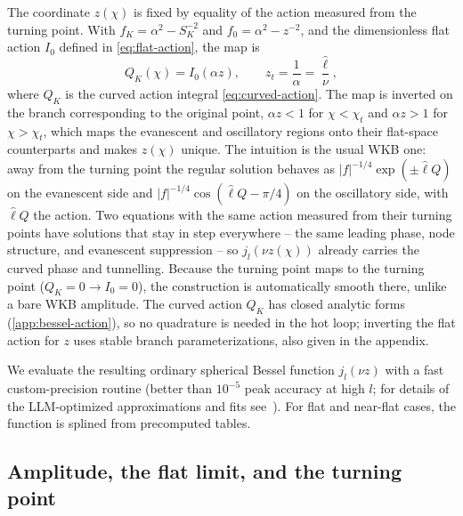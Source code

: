 \documentclass[prd, twocolumn, superscriptaddress, tightenlines, longbibliography, nofootinbib, eqsecnum, amsfonts, amsmath, floatfix, notitlepage]{revtex4-2}
\newcommand{\SK}{S_K}
\newcommand{\jl}{j_l}
\begin{document}
The coordinate $z(\chi)$ is fixed by equality of the action measured from the
turning point. With $f_K=\alpha^2-\SK^{-2}$ and $f_0=\alpha^2-z^{-2}$, and the
dimensionless flat action $I_0$ defined in \cref{eq:flat-action}, the map is
\begin{equation}
  Q_K(\chi)=I_0(\alpha z),\qquad z_t=\frac1\alpha=\frac{\hat\ell}{\nu},
  \label{eq:action-map}
\end{equation}
where $Q_K$ is the curved action integral \cref{eq:curved-action}. The map is
inverted on the branch corresponding to the original point, $\alpha z<1$ for
$\chi<\chi_t$ and $\alpha z>1$ for $\chi>\chi_t$, which maps the evanescent and
oscillatory regions onto their flat-space counterparts and makes $z(\chi)$
unique. The intuition
is the usual WKB one: away from the turning point the regular solution behaves as
$|f|^{-1/4}\exp(\pm\hat\ell Q)$ on the evanescent side and
$|f|^{-1/4}\cos(\hat\ell Q-\pi/4)$ on the oscillatory side, with $\hat\ell Q$ the action.
Two equations with the same action measured from their turning points have
solutions that stay in step everywhere -- the same leading phase, node
structure, and evanescent suppression -- so $\jl(\nu z(\chi))$ already carries the curved phase and
tunnelling. Because the turning point maps to the turning point ($Q_K=0\to
I_0=0$), the construction is automatically smooth there, unlike a bare WKB
amplitude. The curved action $Q_K$ has closed analytic forms
(\cref{app:bessel-action}), so no quadrature is needed in the hot loop; inverting
the flat action for $z$ uses stable branch parameterizations, also given in the
appendix.

We evaluate the resulting ordinary spherical Bessel function $\jl(\nu z)$ with a fast custom-precision routine (better than $10^{-5}$ peak accuracy at high $l$; for details of the LLM-optimized approximations and fits see~\cite{cambflatbessel}).
For flat and near-flat cases, the function is splined from precomputed tables.


\subsection{Amplitude, the flat limit, and the turning point}
\label{sec:bessel-amp}
\end{document}
